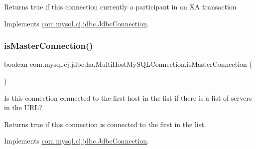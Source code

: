 \begin{DoxyReturn}{Returns}
true if this connection currently a participant in an XA transaction 
\end{DoxyReturn}


Implements \mbox{\hyperlink{interfacecom_1_1mysql_1_1cj_1_1jdbc_1_1_jdbc_connection_a919152df37a4bf60c12c0818256a90a3}{com.\+mysql.\+cj.\+jdbc.\+Jdbc\+Connection}}.

\mbox{\label{classcom_1_1mysql_1_1cj_1_1jdbc_1_1ha_1_1_multi_host_my_s_q_l_connection_a0c1fb78db80d2aedf2d8aa89ff182b5a}} 
\subsubsection{\texorpdfstring{is\+Master\+Connection()}{isMasterConnection()}}
{\footnotesize\ttfamily boolean com.\+mysql.\+cj.\+jdbc.\+ha.\+Multi\+Host\+My\+S\+Q\+L\+Connection.\+is\+Master\+Connection (\begin{DoxyParamCaption}{ }\end{DoxyParamCaption})}

Is this connection connected to the first host in the list if there is a list of servers in the U\+RL?

\begin{DoxyReturn}{Returns}
true if this connection is connected to the first in the list. 
\end{DoxyReturn}


Implements \mbox{\hyperlink{interfacecom_1_1mysql_1_1cj_1_1jdbc_1_1_jdbc_connection_a012dc133872dd4d6db6d6f98118d3251}{com.\+mysql.\+cj.\+jdbc.\+Jdbc\+Connection}}.

\mbox{\label{classcom_1_1mysql_1_1cj_1_1jdbc_1_1ha_1_1_multi_host_my_s_q_l_connection_a1fc6293e6251ae130d1444c288a60031}} 

